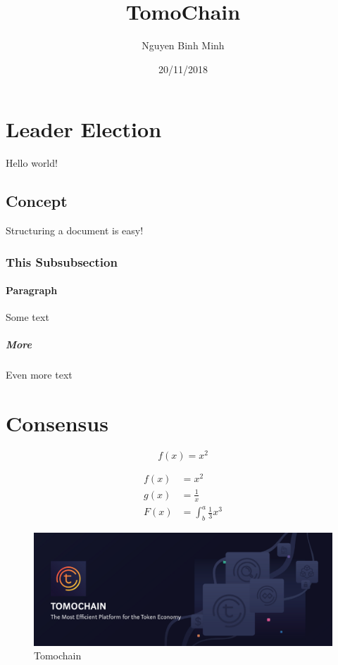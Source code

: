 \documentclass{article}
\title{TomoChain}
\date{20/11/2018}
\author{Nguyen Binh Minh}
\begin{document}
	\maketitle
	\newpage
	
	\section{Leader Election}
	Hello world!
	
		\subsection{Concept}
			Structuring a document is easy!
			\subsubsection{This Subsubsection}
		\paragraph{Paragraph}
			Some text
			\subparagraph{More}
			Even more text
	\section{Consensus}

	\begin{equation}
		f(x) = x^2
	\end{equation}
	
	\begin{align*}
 		f(x) &= x^2\\	
 		g(x) &= \frac{1}{x}\\
 		F(x) &= \int^a_b \frac{1}{3}x^3
	\end{align*}

	\begin{figure}[b!]
		\includegraphics[width=\linewidth]{1.png}
		\caption{Tomochain}
	\end{figure}
	
	
\end{document}
